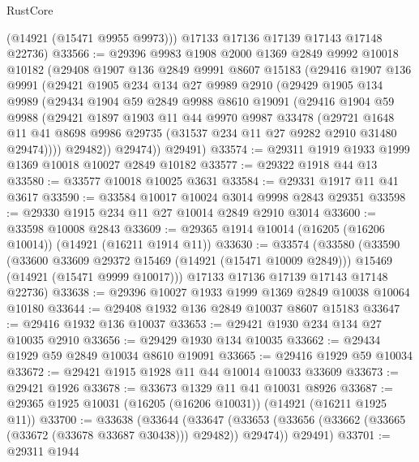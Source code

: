 \begin{lexlean}{RustCore}
\begin{coremodule}
        (@14921 (@15471 @9955 @9973)))
      @17133
      @17136
      @17139
      @17143
      @17148
      @22736)
@33566 := @29396
    @9983
    @1908
    @2000
    @1369
    @2849
    @9992
    @10018
    @10182
    (@29408
      @1907
      @136
      @2849
      @9991
      @8607
      @15183
      (@29416
        @1907
        @136
        @9991
        (@29421
          @1905
          @234
          @134
          @27
          @9989
          @2910
          (@29429
            @1905
            @134
            @9989
            (@29434
              @1904
              @59
              @2849
              @9988
              @8610
              @19091
              (@29416
                @1904
                @59
                @9988
                (@29421
                  @1897
                  @1903
                  @11
                  @44
                  @9970
                  @9987
                  @33478
                  (@29721
                    @1648
                    @11
                    @41
                    @8698
                    @9986
                    @29735
                    (@31537 @234 @11 @27 @9282 @2910 @31480 @29474))))
              @29482))
          @29474))
      @29491)
@33574 := @29311 @1919 @1933 @1999 @1369 @10018 @10027 @2849 @10182
@33577 := @29322 @1918 @44 @13
@33580 := @33577 @10018 @10025 @3631
@33584 := @29331 @1917 @11 @41 @3617
@33590 := @33584 @10017 @10024 @3014 @9998 @2843 @29351
@33598 := @29330 @1915 @234 @11 @27 @10014 @2849 @2910 @3014
@33600 := @33598 @10008 @2843
@33609 := @29365 @1914 @10014 (@16205 (@16206 @10014)) (@14921 (@16211 @1914 @11))
@33630 := @33574
    (@33580
      (@33590
        (@33600 @33609 @29372 @15469 (@14921 (@15471 @10009 @2849)))
        @15469
        (@14921 (@15471 @9999 @10017)))
      @17133
      @17136
      @17139
      @17143
      @17148
      @22736)
@33638 := @29396 @10027 @1933 @1999 @1369 @2849 @10038 @10064 @10180
@33644 := @29408 @1932 @136 @2849 @10037 @8607 @15183
@33647 := @29416 @1932 @136 @10037
@33653 := @29421 @1930 @234 @134 @27 @10035 @2910
@33656 := @29429 @1930 @134 @10035
@33662 := @29434 @1929 @59 @2849 @10034 @8610 @19091
@33665 := @29416 @1929 @59 @10034
@33672 := @29421 @1915 @1928 @11 @44 @10014 @10033 @33609
@33673 := @29421 @1926
@33678 := @33673 @1329 @11 @41 @10031 @8926
@33687 := @29365 @1925 @10031 (@16205 (@16206 @10031)) (@14921 (@16211 @1925 @11))
@33700 := @33638
    (@33644
      (@33647 (@33653 (@33656 (@33662 (@33665 (@33672 (@33678 @33687 @30438))) @29482)) @29474))
      @29491)
@33701 := @29311 @1944

\end{coremodule}
\end{lexlean}
